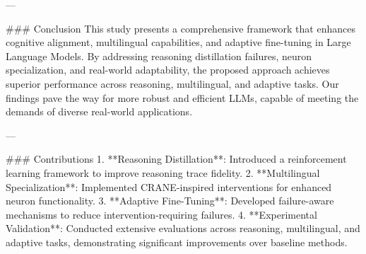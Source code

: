 ---

### Conclusion
This study presents a comprehensive framework that enhances cognitive alignment, multilingual capabilities, and adaptive fine-tuning in Large Language Models. By addressing reasoning distillation failures, neuron specialization, and real-world adaptability, the proposed approach achieves superior performance across reasoning, multilingual, and adaptive tasks. Our findings pave the way for more robust and efficient LLMs, capable of meeting the demands of diverse real-world applications.

---

### Contributions
1. **Reasoning Distillation**: Introduced a reinforcement learning framework to improve reasoning trace fidelity.
2. **Multilingual Specialization**: Implemented CRANE-inspired interventions for enhanced neuron functionality.
3. **Adaptive Fine-Tuning**: Developed failure-aware mechanisms to reduce intervention-requiring failures.
4. **Experimental Validation**: Conducted extensive evaluations across reasoning, multilingual, and adaptive tasks, demonstrating significant improvements over baseline methods.